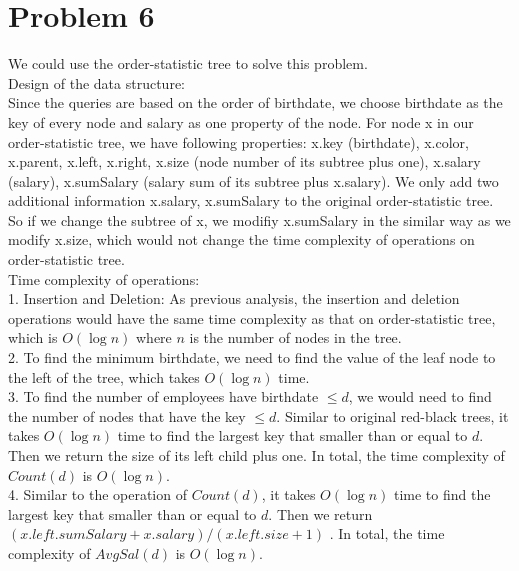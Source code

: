 \documentclass[twoside,11pt]{homework}
\begin{document}
\section*{Problem 6}
We could use the order-statistic tree to solve this problem.\\
Design of the data structure:\\
Since the queries are based on the order of birthdate, we choose birthdate as the key of every node and salary as one property of the node.
For node x in our order-statistic tree, we have following properties: x.key (birthdate), x.color, x.parent, x.left, x.right, x.size (node number of its subtree plus one), x.salary (salary), x.sumSalary (salary sum of its subtree plus x.salary).
We only add two additional information x.salary, x.sumSalary to the original order-statistic tree. 
So if we change the subtree of x, we modifiy x.sumSalary in the similar way as we modify x.size, which would not change the time complexity of operations on order-statistic tree. 
\\
Time complexity of operations:\\
1. Insertion and Deletion: As previous analysis, the insertion and deletion operations would have the same time complexity as that on order-statistic tree, which is $O(\log n)$ where $n$ is the number of nodes in the tree. \\
2. To find the minimum birthdate, we need to find the value of the leaf node to the left of the tree, which takes  $O(\log n)$  time. \\
3. To find the number of employees have birthdate $\le d$, we would need to find the number of nodes that have the key $\le d$.
Similar to original red-black trees, it takes $O(\log n)$ time to find the largest key that smaller than or equal to $d$.
Then we return the size of its left child plus one.
In total, the time complexity of $Count(d)$ is $O(\log n)$.\\
4. Similar to the operation of $Count(d)$, it takes $O(\log n)$ time to find the largest key that smaller than or equal to $d$.
Then we return $(x.left.sumSalary + x.salary)/(x.left.size+1)$ .
In total, the time complexity of $AvgSal(d)$ is $O(\log n)$.
\end{document}
